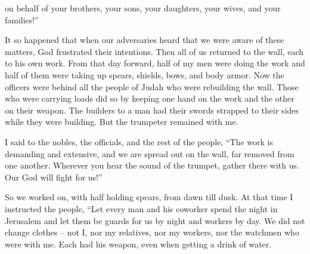 {on
behalf of your brothers,
your sons,
your daughters,
your wives,
and your families!”
\par }{\PP {}It so happened
that
when our adversaries
heard
that
we were aware
of these matters, God
frustrated
their intentions.
Then all
of us returned
to
the wall,
each
to
his own work.
From
that day
forward, half
of my men
were doing
the work
and half
of them were taking up
spears,
shields,
bows,
and body armor.
Now the officers
were behind
all
the people
of Judah
who were rebuilding
the wall.
Those who were carrying
loads
did
so by keeping one
hand
on the work
and the other
on their weapon.
The builders
to a man
had their swords
strapped
to
their sides
while they were building.
But the trumpeter
remained with me.
\par }{\PP {}I said
to
the nobles,
the officials,
and the rest
of the people,
“The work
is demanding
and extensive,
and we
are spread
out on
the wall,
far
removed from one
another.
Wherever
you hear
the sound
of the trumpet,
gather
there
with us.
Our God
will fight for us!”
\par }{\PP {}So we
worked
on, with half
holding
spears,
from dawn
till
dusk.
At that time
I instructed
the people,
“Let every man
and his coworker
spend
the night in
Jerusalem
and let them be
guards for us by night
and workers
by day.
We
did not change
clothes –
not
I,
nor my relatives,
nor my workers,
nor
the watchmen
who
were with
me. Each
had his weapon,
even when getting a drink of water.

}
